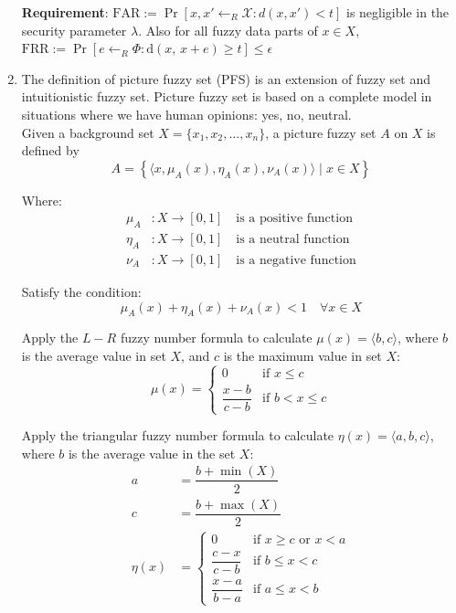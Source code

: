 \documentclass[graybox]{svmult}
\begin{document}
\begin{enumerate}[label=(\roman*), itemsep=1em]
          \textbf{Requirement}: \( \text{FAR} := \Pr[x, x' \leftarrow_{{R}} {\mathcal{X}} : d(x, x') < t] \) is negligible in the security parameter  \( \lambda \). Also for all fuzzy data parts of \( x \in {X} \), \( \text{FRR} := \Pr[e \leftarrow_{{R}} \varPhi : \mathrm{d}(x, \, x + e) \geq t] \leq \epsilon \)
    \item The definition of picture fuzzy set (PFS) is an extension of fuzzy set and intuitionistic fuzzy set. Picture fuzzy set is based on a complete model in situations where we have human opinions: yes, no, neutral. \\[6pt]
          Given a background set \( X = \{x_1, x_2, \dots, x_n \} \), a picture fuzzy set \( A \) on \( X \) is defined by
          \[
              A = \left\{ \langle x, \mu_A(x), \eta_A(x), \nu_A(x) \rangle \mid x \in X \right\}
          \]

          Where:
          \begin{align*}
              \mu_A  & : X \to [0, 1] \quad \text{is a positive function} \\[6pt]
              \eta_A & : X \to [0, 1] \quad \text{is a neutral function}  \\[6pt]
              \nu_A  & : X \to [0, 1] \quad \text{is a negative function}
          \end{align*}

          Satisfy the condition:
          \[
              \mu_A(x) + \eta_A(x) + \nu_A(x) < 1 \quad \forall x \in X
          \]

          Apply the \( L- R \) fuzzy number formula to calculate \( \mu(x) = \langle b, c \rangle \), where \( b \) is the average value in set \( X \), and \( c \) is the maximum value in set \( X \):
          \[
              \mu(x) = \begin{cases}
                  0                & \text{if } x \leq c     \\
                  \dfrac{x-b}{c-b} & \text{if } b < x \leq c
              \end{cases}
          \]

          Apply the triangular fuzzy number formula to calculate \( \eta(x) = \langle a, b, c \rangle \), where \( b \) is the average value in the set \( X \):
          \begin{align*}
              a       & = \dfrac{b + \min(X)}{2}                                          \\[6pt]
              c       & = \dfrac{b + \max(X)}{2}                                          \\[6pt]
              \eta(x) & = \begin{cases}
                              0                & \text{if } x \geq c \text{ or } x < a \\
                              \dfrac{c-x}{c-b} & \text{if } b \leq x < c               \\[6pt]
                              \dfrac{x-a}{b-a} & \text{if } a \leq x < b
                          \end{cases}
          \end{align*}



\end{enumerate}
\end{document}
